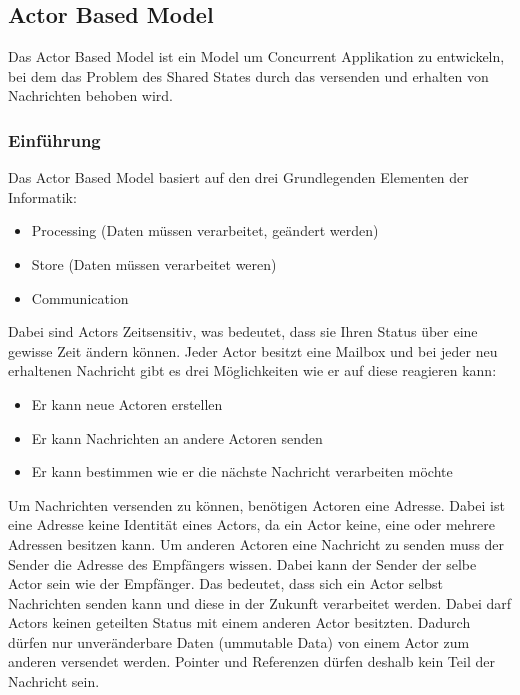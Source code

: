 \subsection{Actor Based Model}
\label{section:Actor Based Model}

Das Actor Based Model ist ein Model um Concurrent Applikation zu entwickeln, bei dem das Problem des Shared States durch das versenden und erhalten von Nachrichten behoben wird. 

\subsubsection{Einführung}

Das Actor Based Model basiert auf den drei Grundlegenden Elementen der Informatik:

\begin{itemize}
  \item Processing (Daten müssen verarbeitet, geändert werden)
  \item Store (Daten müssen verarbeitet weren)
  \item Communication
\end{itemize}

Dabei sind Actors Zeitsensitiv, was bedeutet, dass sie Ihren Status über eine gewisse Zeit ändern können. Jeder Actor besitzt eine Mailbox und bei jeder neu erhaltenen Nachricht gibt es drei Möglichkeiten wie er auf diese reagieren kann:

\begin{itemize}
  \item Er kann neue Actoren erstellen
  \item Er kann Nachrichten an andere Actoren senden
  \item Er kann bestimmen wie er die nächste Nachricht verarbeiten möchte
\end{itemize}

Um Nachrichten versenden zu können, benötigen Actoren eine Adresse. Dabei ist eine Adresse keine Identität eines Actors, da ein Actor keine, eine oder mehrere Adressen besitzen kann. Um anderen Actoren eine Nachricht zu senden muss der Sender die Adresse des Empfängers wissen. Dabei kann der Sender der selbe Actor sein wie der Empfänger. Das bedeutet, dass sich ein Actor selbst Nachrichten senden kann und diese in der Zukunft verarbeitet werden. Dabei darf Actors keinen geteilten Status mit einem anderen Actor besitzten. Dadurch dürfen nur unveränderbare Daten (ummutable Data) von einem Actor zum anderen versendet werden. Pointer und Referenzen dürfen deshalb kein Teil der Nachricht sein. \cite[]{Erb2012}


